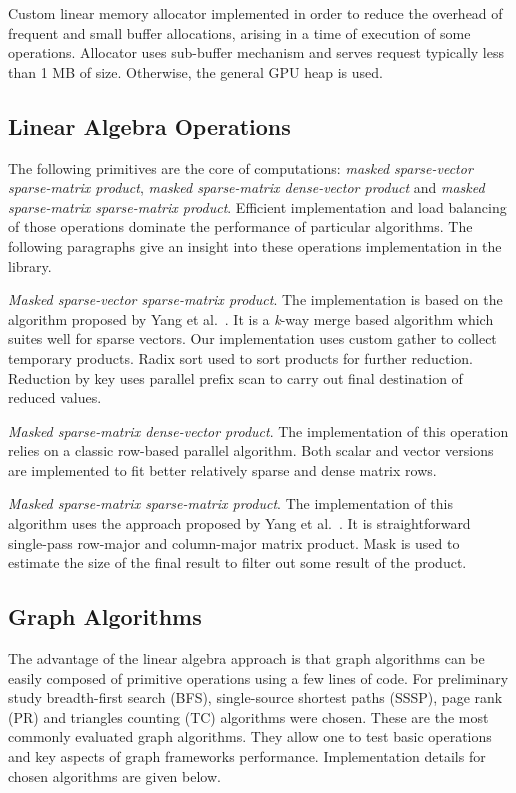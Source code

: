 Custom linear memory allocator implemented in order to reduce the overhead of frequent and small buffer allocations, arising in a time of execution of some operations. Allocator uses sub-buffer mechanism and serves request typically less than 1 MB of size. Otherwise, the general GPU heap is used.

\subsection{Linear Algebra Operations}

The following primitives are the core of computations: \textit{masked sparse-vector sparse-matrix product}, \textit{masked sparse-matrix dense-vector product} and \textit{masked sparse-matrix sparse-matrix product}. Efficient implementation and load balancing of those operations dominate the performance of particular algorithms. The following paragraphs give an insight into these operations implementation in the library.

\textit{Masked sparse-vector sparse-matrix product}. The implementation is based on the algorithm proposed by Yang et al.~\cite{7284398:spvspm}. It is a \textit{k}-way merge based algorithm which suites well for sparse vectors. Our implementation uses custom gather to collect temporary products. Radix sort used to sort products for further reduction. Reduction by key uses parallel prefix scan to carry out final destination of reduced values.

\textit{Masked sparse-matrix dense-vector product}. The implementation of this operation relies on a classic row-based parallel algorithm. Both scalar and vector versions are implemented to fit better relatively sparse and dense matrix rows. 

\textit{Masked sparse-matrix sparse-matrix product}. The implementation of this algorithm uses the approach proposed by Yang et al.~\cite{yang2019graphblast}. It is straightforward single-pass row-major and column-major matrix product. Mask is used to estimate the size of the final result to filter out some result of the product. 

\subsection{Graph Algorithms}

The advantage of the linear algebra approach is that graph algorithms can be easily composed of primitive operations using a few lines of code. For preliminary study breadth-first search (BFS), single-source shortest paths (SSSP), page rank (PR) and triangles counting (TC) algorithms were chosen. These are the most commonly evaluated graph algorithms. They allow one to test basic operations and key aspects of graph frameworks performance. Implementation details for chosen algorithms are given below. 

